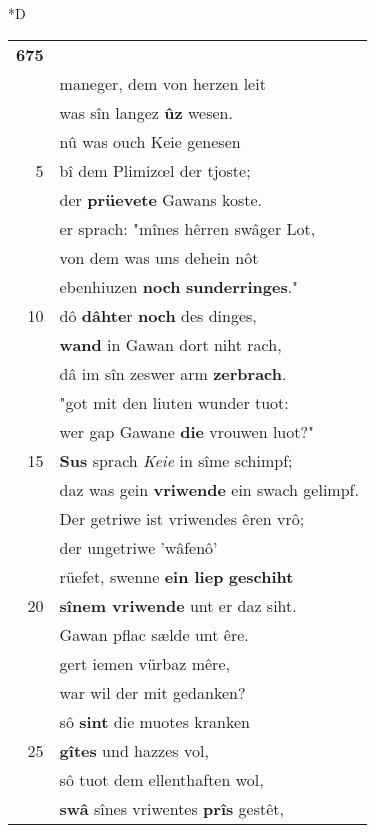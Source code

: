 \documentclass[8pt,a4paper,notitlepage]{article}
\begin{document}
\begin{table}[ht]
\begin{minipage}[t]{0.5\linewidth}
\small
\begin{center}*D
\end{center}
\begin{tabular}{rl}
\textbf{675} & \textbf{\begin{large}I\end{large}n sîne} herberge reit\\ 
 & maneger, dem von herzen leit\\ 
 & was sîn langez \textbf{ûz} wesen.\\ 
 & nû was ouch Keie genesen\\ 
5 & bî dem Plimizœl der tjoste;\\ 
 & der \textbf{prüevete} Gawans koste.\\ 
 & er sprach: "mînes hêrren swâger Lot,\\ 
 & von dem was uns dehein nôt\\ 
 & ebenhiuzen \textbf{noch} \textbf{sunderringes}."\\ 
10 & dô \textbf{dâhte}r \textbf{noch} des dinges,\\ 
 & \textbf{wand} in Gawan dort niht rach,\\ 
 & dâ im sîn zeswer arm \textbf{zerbrach}.\\ 
 & "got mit den liuten wunder tuot:\\ 
 & wer gap Gawane \textbf{die} vrouwen luot?"\\ 
15 & \textbf{Sus} sprach \textit{Keie} in sîme schimpf;\\ 
 & daz was gein \textbf{vriwende} ein swach gelimpf.\\ 
 & Der getriwe ist vriwendes êren vrô;\\ 
 & der ungetriwe 'wâfenô'\\ 
 & rüefet, swenne \textbf{ein liep} \textbf{geschiht}\\ 
20 & \textbf{sînem vriwende} unt er daz siht.\\ 
 & Gawan pflac sælde unt êre.\\ 
 & gert iemen vürbaz mêre,\\ 
 & war wil der mit gedanken?\\ 
 & sô \textbf{sint} die muotes kranken\\ 
25 & \textbf{gîtes} und hazzes vol,\\ 
 & sô tuot dem ellenthaften wol,\\ 
 & \textbf{swâ} sînes vriwentes \textbf{prîs} gestêt,\\ 

\end{tabular}
\end{minipage}
\end{table}
\end{document}
